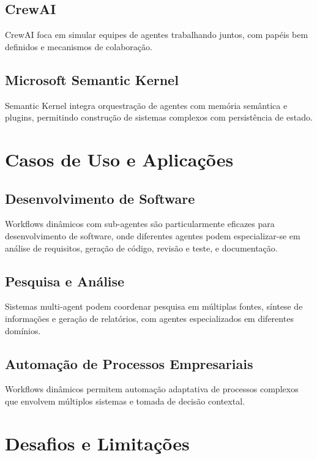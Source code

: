 \documentclass[OA,linenum]{InterPore}
\begin{document}
\subsection{CrewAI}

CrewAI foca em simular equipes de agentes trabalhando juntos, com papéis bem definidos e mecanismos de colaboração.

\subsection{Microsoft Semantic Kernel}

Semantic Kernel integra orquestração de agentes com memória semântica e plugins, permitindo construção de sistemas complexos com persistência de estado.

\section{Casos de Uso e Aplicações}

\subsection{Desenvolvimento de Software}

Workflows dinâmicos com sub-agentes são particularmente eficazes para desenvolvimento de software, onde diferentes agentes podem especializar-se em análise de requisitos, geração de código, revisão e teste, e documentação.

\subsection{Pesquisa e Análise}

Sistemas multi-agent podem coordenar pesquisa em múltiplas fontes, síntese de informações e geração de relatórios, com agentes especializados em diferentes domínios.

\subsection{Automação de Processos Empresariais}

Workflows dinâmicos permitem automação adaptativa de processos complexos que envolvem múltiplos sistemas e tomada de decisão contextal.

\section{Desafios e Limitações}
\end{document}
